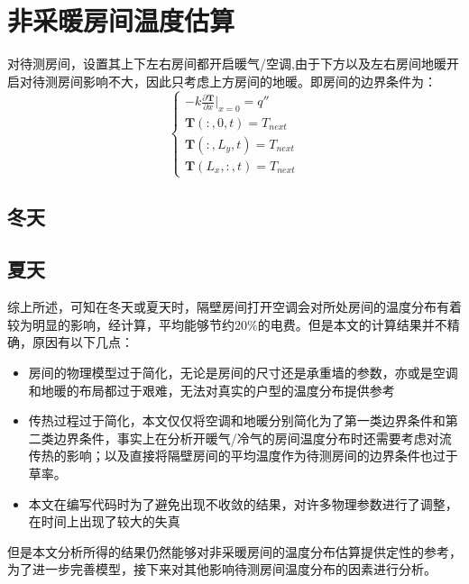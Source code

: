 \documentclass{article}
\begin{document}


\newpage

\section{非采暖房间温度估算}

对待测房间，设置其上下左右房间都开启暖气/空调,由于下方以及左右房间地暖开启对待测房间影响不大，因此只考虑上方房间的地暖。即房间的边界条件为：
\begin{equation}
    \begin{cases}
    -k\frac{\partial \boldsymbol{T}}{\partial x}\big|_{x=0} = q'' \\
    \boldsymbol{T}(:,0,t) = T_{next} \\
    \boldsymbol{T}(:,L_y,t) = T_{next} \\
    \boldsymbol{T}(L_x,:,t) = T_{next}
    \end{cases}
    \label{boundary}
\end{equation}

\subsection{冬天}



\subsection{夏天}



综上所述，可知在冬天或夏天时，隔壁房间打开空调会对所处房间的温度分布有着较为明显的影响，经计算，平均能够节约$20\%$的电费。但是本文的计算结果并不精确，原因有以下几点：
\begin{itemize}
    \item 房间的物理模型过于简化，无论是房间的尺寸还是承重墙的参数，亦或是空调和地暖的布局都过于艰难，无法对真实的户型的温度分布提供参考
    \item 传热过程过于简化，本文仅仅将空调和地暖分别简化为了第一类边界条件和第二类边界条件，事实上在分析开暖气/冷气的房间温度分布时还需要考虑对流传热的影响；以及直接将隔壁房间的平均温度作为待测房间的边界条件也过于草率。
    \item 本文在编写代码时为了避免出现不收敛的结果，对许多物理参数进行了调整，在时间上出现了较大的失真
\end{itemize}

但是本文分析所得的结果仍然能够对非采暖房间的温度分布估算提供定性的参考，为了进一步完善模型，接下来对其他影响待测房间温度分布的因素进行分析。
\end{document}
